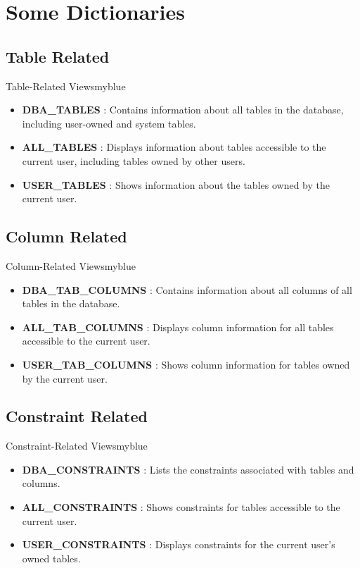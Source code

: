 \section{Some Dictionaries}

\subsection{Table Related}
\begin{prettyBox}{Table-Related Views}{myblue}
\begin{itemize}
    \item \textbf{DBA\_TABLES} : Contains information about all tables in the database, including user-owned and system tables.
    \item \textbf{ALL\_TABLES} : Displays information about tables accessible to the current user, including tables owned by other users.
    \item \textbf{USER\_TABLES} : Shows information about the tables owned by the current user.
\end{itemize}
\end{prettyBox}

\vspace{0.25cm}
\subsection{Column Related}
\begin{prettyBox}{Column-Related Views}{myblue}
\begin{itemize}
    \item \textbf{DBA\_TAB\_COLUMNS} : Contains information about all columns of all tables in the database.
    \item \textbf{ALL\_TAB\_COLUMNS} : Displays column information for all tables accessible to the current user.
    \item \textbf{USER\_TAB\_COLUMNS} : Shows column information for tables owned by the current user.
\end{itemize}
\end{prettyBox}

\vspace{0.25cm}
\subsection{Constraint Related}
\begin{prettyBox}{Constraint-Related Views}{myblue}
\begin{itemize}
    \item \textbf{DBA\_CONSTRAINTS} : Lists the constraints associated with tables and columns.
    \item \textbf{ALL\_CONSTRAINTS} : Shows constraints for tables accessible to the current user.
    \item \textbf{USER\_CONSTRAINTS} : Displays constraints for the current user's owned tables.
\end{itemize}
\end{prettyBox}

